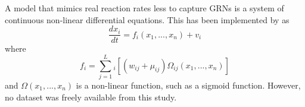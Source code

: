 \documentclass[../main.tex]{subfiles}
\begin{document}
A model that mimics real reaction rates less to capture GRNs is a system of continuous non-linear differential equations.
This has been implemented by \cite{qian2008inference} as
%
\begin{equation}
\frac{dx_i}{dt} = f_i(x_1,...,x_n) + v_i
\end{equation}
%
where
%
\begin{equation}
f_i = \sum_{j=1}^L_i [(w_{ij}+ \mu_{ij})\Omega_{ij}(x_1,...,x_n)]
\end{equation}
%
and $\Omega(x_1,...,x_n)$ is a non-linear function, such as a sigmoid function.
However, no dataset was freely available from this study.


\end{document}
